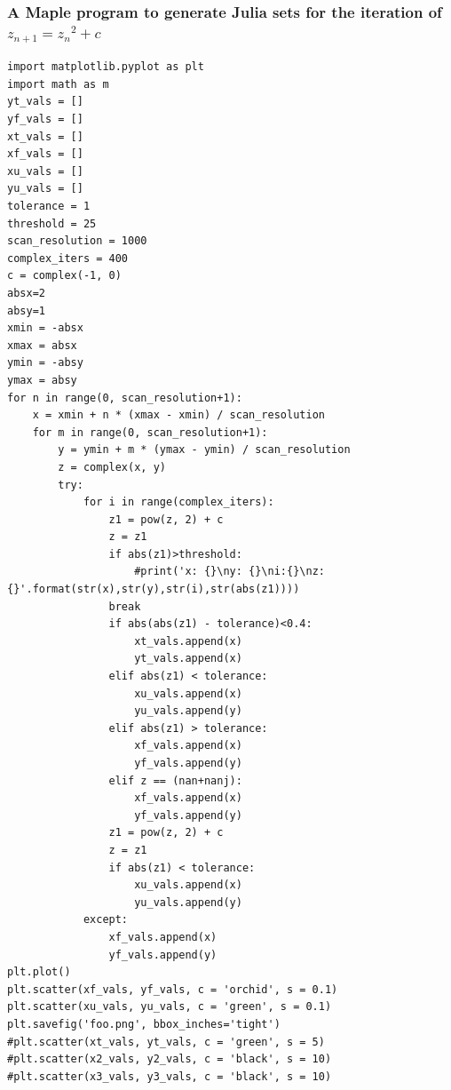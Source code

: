 \documentclass[12pt]{article}
\begin{document}
\subsubsection{A Maple program to generate Julia sets for the iteration of $z_{n+1}={z_n}^2+c$}
\begin{lstlisting}
import matplotlib.pyplot as plt
import math as m
yt_vals = []
yf_vals = []
xt_vals = []
xf_vals = []
xu_vals = []
yu_vals = []
tolerance = 1
threshold = 25
scan_resolution = 1000
complex_iters = 400
c = complex(-1, 0)
absx=2
absy=1
xmin = -absx
xmax = absx
ymin = -absy
ymax = absy
for n in range(0, scan_resolution+1):
	x = xmin + n * (xmax - xmin) / scan_resolution
	for m in range(0, scan_resolution+1):
		y = ymin + m * (ymax - ymin) / scan_resolution
		z = complex(x, y)
		try:
			for i in range(complex_iters):
				z1 = pow(z, 2) + c
				z = z1
				if abs(z1)>threshold:
					#print('x: {}\ny: {}\ni:{}\nz: {}'.format(str(x),str(y),str(i),str(abs(z1))))
				break
				if abs(abs(z1) - tolerance)<0.4:
					xt_vals.append(x)
					yt_vals.append(x)
				elif abs(z1) < tolerance:
					xu_vals.append(x)
					yu_vals.append(y)
				elif abs(z1) > tolerance:
					xf_vals.append(x)
					yf_vals.append(y)
				elif z == (nan+nanj):
					xf_vals.append(x)
					yf_vals.append(y)
				z1 = pow(z, 2) + c
				z = z1
				if abs(z1) < tolerance:
					xu_vals.append(x)
					yu_vals.append(y)
			except:
				xf_vals.append(x)
				yf_vals.append(y)
plt.plot()
plt.scatter(xf_vals, yf_vals, c = 'orchid', s = 0.1)
plt.scatter(xu_vals, yu_vals, c = 'green', s = 0.1)
plt.savefig('foo.png', bbox_inches='tight')
#plt.scatter(xt_vals, yt_vals, c = 'green', s = 5)
#plt.scatter(x2_vals, y2_vals, c = 'black', s = 10)
#plt.scatter(x3_vals, y3_vals, c = 'black', s = 10)


\end{lstlisting}
\newpage	
\end{document}
